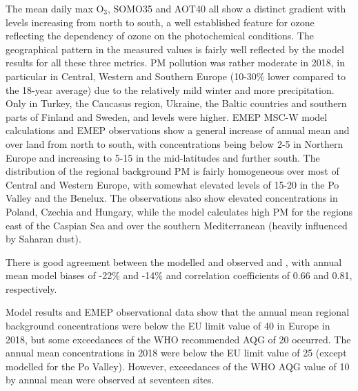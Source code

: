 The mean daily max O$_3$, SOMO35 and AOT40 all show a distinct gradient with levels increasing from north to south, a well established feature for ozone reflecting the dependency of ozone on the photochemical conditions. The geographical pattern in the measured values is fairly well reflected by the model results for all these three metrics.
PM pollution was rather moderate in 2018, in particular in Central, Western and Southern Europe (10-30\% lower compared to the 18-year average) due to the relatively mild winter and more precipitation. Only in Turkey, the Caucasus region, Ukraine, the Baltic countries and southern parts of Finland and Sweden, \PM[10] and \PM[2.5] levels were higher. 
EMEP MSC-W model calculations and EMEP observations show a general increase of annual mean \PM[10] and \PM[2.5] over land from north to south, with concentrations being below 2-5 \ug in Northern
Europe and increasing to 5-15 \ug in the mid-latitudes and further south.
The distribution of the regional background PM is fairly homogeneous over most of Central and Western Europe, with somewhat elevated \PM[10] levels of 15-20 \ug in the Po Valley and the Benelux. The observations also show elevated \PM[10] concentrations in Poland, Czechia and Hungary, while the model calculates high PM for the regions east of the Caspian Sea and over the southern Mediterranean (heavily influenced by Saharan dust). 

There is good agreement between the modelled and observed \PM[10] and \PM[2.5], with annual mean model biases of -22\% and -14\% and correlation coefficients of 0.66 and 0.81, respectively.

Model results and EMEP observational data show that the annual mean regional background \PM[10] concentrations were below the EU limit value of 40 \ug in Europe in 2018, but some exceedances of the WHO recommended AQG of 20 \ug occurred. 
The annual mean \PM[2.5] concentrations in 2018 were below the EU limit value of 25 \ug (except modelled \PM[2.5] for the Po Valley). However, exceedances of the WHO AQG value of 10 \ug by annual mean \PM[2.5] were observed at seventeen sites.%

